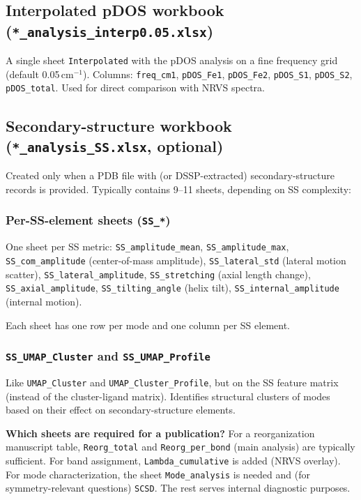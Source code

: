 \documentclass[11pt,a4paper,twoside]{article}
\theoremstyle{remark}
\begin{document}
\subsection{Interpolated pDOS workbook (\texttt{*\_analysis\_interp0.05.xlsx})}
\label{app:wb-interp}

A single sheet \texttt{Interpolated} with the pDOS analysis on a
fine frequency grid (default 0.05\,cm$^{-1}$). Columns:
\texttt{freq\_cm1}, \texttt{pDOS\_Fe1}, \texttt{pDOS\_Fe2},
\texttt{pDOS\_S1}, \texttt{pDOS\_S2}, \texttt{pDOS\_total}. Used
for direct comparison with NRVS spectra.

\subsection{Secondary-structure workbook
            (\texttt{*\_analysis\_SS.xlsx}, optional)}
\label{app:wb-ss}

Created only when a PDB file with (or DSSP-extracted)
secondary-structure records is provided. Typically contains
9--11 sheets, depending on SS complexity:

\subsubsection*{Per-SS-element sheets (\texttt{SS\_*})}

One sheet per SS metric:
\texttt{SS\_amplitude\_mean},
\texttt{SS\_amplitude\_max},
\texttt{SS\_com\_amplitude} (center-of-mass amplitude),
\texttt{SS\_lateral\_std} (lateral motion scatter),
\texttt{SS\_lateral\_amplitude},
\texttt{SS\_stretching} (axial length change),
\texttt{SS\_axial\_amplitude},
\texttt{SS\_tilting\_angle} (helix tilt),
\texttt{SS\_internal\_amplitude} (internal motion).

Each sheet has one row per mode and one column per SS element.

\subsubsection*{\texttt{SS\_UMAP\_Cluster} and \texttt{SS\_UMAP\_Profile}}

Like \texttt{UMAP\_Cluster} and \texttt{UMAP\_Cluster\_Profile},
but on the SS feature matrix (instead of the cluster-ligand
matrix). Identifies structural clusters of modes based on their
effect on secondary-structure elements.

\begin{infobox}
\textbf{Which sheets are required for a publication?}
For a reorganization manuscript table, \texttt{Reorg\_total} and
\texttt{Reorg\_per\_bond} (main analysis) are typically
sufficient. For band assignment, \texttt{Lambda\_cumulative} is
added (NRVS overlay). For mode characterization, the sheet
\texttt{Mode\_analysis} is needed and (for symmetry-relevant
questions) \texttt{SCSD}. The rest serves internal diagnostic
purposes.
\end{infobox}
\end{document}
